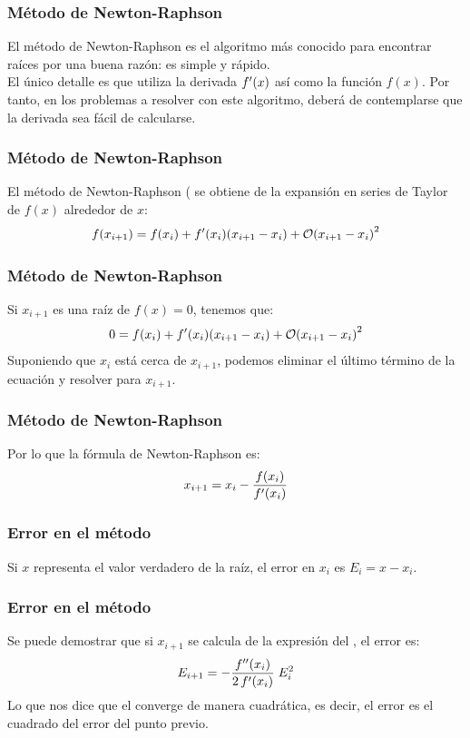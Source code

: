 \documentclass[12pt]{beamer}
\begin{document}
\begin{frame}
\frametitle{Método de Newton-Raphson}
El método de Newton-Raphson es el algoritmo más conocido para encontrar raíces por una buena razón: es simple y rápido.
\\
\bigskip
\pause
El único detalle es que utiliza la derivada ${f}^{\prime} (x)$ así como la función $ f(x)$. \pause Por tanto, en los problemas a resolver con este algoritmo, deberá de contemplarse que la derivada sea fácil de calcularse.
\end{frame}
\begin{frame}
\frametitle{Método de Newton-Raphson}
El método de Newton-Raphson ( se obtiene de la expansión en series de Taylor de $f (x)$ alrededor de $x$:
\pause
\begin{align*}
f (x_{i + 1})  = f (x_{i}) + \pderivada{f} (x_{i})(x_{i + 1} - x_{i}) +\order{x_{i + 1} - x_{i}}^{2}
\end{align*}
\end{frame}
\begin{frame}\frametitle{Método de Newton-Raphson}
Si $x_{i + 1}$ es una raíz de $f (x) = 0$, tenemos que:
\pause
\begin{align*}
0 = f (x_{i}) + \pderivada{f} (x_{i})(x_{i + 1} - x_{i}) + \order{x_{i + 1} - x_{i}}^{2}
\end{align*}
\pause
Suponiendo que $x_{i}$ está cerca de $x_{i + 1}$, podemos eliminar el último término de la ecuación y resolver para $x_{i+1}$.
\end{frame}
\begin{frame}
\frametitle{Método de Newton-Raphson}
Por lo que la fórmula de Newton-Raphson es:
\pause
\begin{align*}
x_{i+1} = x_{i} - \dfrac{f(x_{i})}{{f}^{\prime} (x_{i})}
\end{align*}
\end{frame}
\begin{frame}
\frametitle{Error en el método}
Si $x$ representa el valor verdadero de la raíz, el error en $x_{i}$ es $E_{i} = x - x_{i}$.
\end{frame}
\begin{frame}
\frametitle{Error en el método}
Se puede demostrar que si $x_{i+1}$ se calcula de la expresión del , el error es:
\pause
\begin{align*}
E_{i+1} = - \dfrac{{f}^{\prime \prime} (x_{i})}{2 \, {f}^{\prime} (x_{i})} \; E_{i}^{2}
\end{align*}
Lo que nos dice que el  converge de manera cuadrática, es decir, el error es el cuadrado del error del punto previo.
\end{frame}
\end{document}
